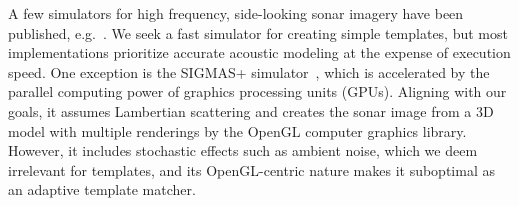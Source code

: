 %

%
A few simulators for high frequency, side-looking sonar imagery have been published, e.g.~\cite{Bell1997,Sammelm2003}. We seek a fast simulator for creating simple templates, but most implementations prioritize accurate acoustic modeling at the expense of execution speed. One exception is the SIGMAS+ simulator~\cite{Coiras2009a, Coiras2009b}, which is accelerated by the parallel computing power of graphics processing units (GPUs). Aligning with our goals, it assumes Lambertian scattering and creates the sonar image from a 3D model with multiple renderings by the OpenGL computer graphics library. However, it includes stochastic effects such as ambient noise, which we deem irrelevant for templates, and its OpenGL-centric nature makes it suboptimal as an adaptive template matcher.







